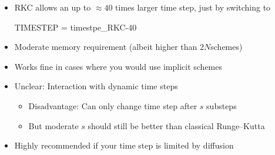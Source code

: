 \documentclass[\mydriver,12pt,twoside,notitlepage]{article}
\newcommand{\BoxLabel}[1]{\fbox{\rmfamily\emph{#1}}}
\newcommand{\ColEmph}[1]{{\color{DarkishRed}#1}}
\newcommand{\colEmph}[1]{{\color{DarkishBlue}#1}}
\begin{document}
\begin{itemize}

\item RKC allows an up to $\approx 40$ times larger time step, just by
  switching to\\
{\small\color{DarkBlue}
\begin{CodeVerbatim}[label=\BoxLabel{Makefile.local}]
  TIMESTEP = timestpe_RKC-40
\end{CodeVerbatim}
}
\item \colEmph{Moderate memory requirement}
  (albeit higher than $2N$schemes)

\item Works fine in cases where you would use implicit schemes

\item Unclear: Interaction with dynamic time steps
  \begin{itemize}
  \item Disadvantage: Can only change time step after $s$ substeps
  \item But moderate $s$ should still be better than classical
    Runge--Kutta
  \end{itemize}

\item \ColEmph{Highly recommended} if your time step is limited by diffusion

\end{itemize}




\end{document}
